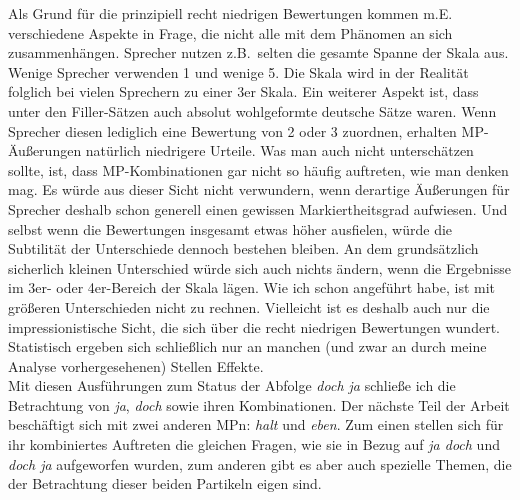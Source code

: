 Als Grund für die prinzipiell recht niedrigen Bewertungen kommen m.E. verschiedene Aspekte in Frage, die nicht alle mit dem Phänomen an sich zusammenhängen. Sprecher nutzen z.B.\ selten die gesamte Spanne der Skala aus. Wenige Sprecher verwenden 1 und wenige 5. Die Skala wird in der Realität folglich bei vielen Sprechern zu einer 3er Skala. Ein weiterer Aspekt ist, dass unter den Filler-Sätzen auch absolut wohlgeformte deutsche Sätze waren. Wenn Sprecher diesen lediglich eine Bewertung von 2 oder 3 zuordnen, erhalten MP-Äußerungen natürlich niedrigere Urteile. Was man auch nicht unterschätzen sollte, ist, dass MP-Kom\-bi\-na\-ti\-on\-en gar nicht so häufig auftreten, wie man denken mag. Es würde aus dieser Sicht nicht verwundern, wenn derartige Äußerungen für Sprecher deshalb schon generell einen gewissen Markiertheitsgrad  aufwiesen. Und selbst wenn die Bewertungen insgesamt etwas höher ausfielen, würde die Subtilität der Unterschiede dennoch bestehen bleiben. An dem grundsätzlich sicherlich kleinen Unterschied würde sich auch nichts ändern, wenn die Ergebnisse im 3er- oder 4er-Bereich der Skala lägen. Wie ich schon angeführt habe, ist mit größeren Unterschieden nicht zu rechnen. Vielleicht ist es deshalb auch nur die impressionistische Sicht, die sich über die recht niedrigen Bewertungen wundert. Statistisch ergeben sich schließlich nur an manchen (und zwar an durch meine Analyse vorhergesehenen) Stellen Effekte.\\

\noindent
Mit diesen Ausführungen zum Status der Abfolge \textit{doch ja} schließe ich die Betrachtung von \textit{ja}, \textit{doch} sowie ihren Kombinationen. Der nächs\-te Teil der Arbeit beschäftigt sich mit zwei anderen MPn: \textit{halt} und \textit{eben}. Zum einen stellen sich für ihr kombiniertes Auftreten die gleichen Fragen, wie sie in Bezug auf \textit{ja doch} und \textit{doch ja} aufgeworfen wurden, zum anderen gibt es aber auch spezielle Themen, die der Betrachtung dieser beiden Partikeln eigen sind.

